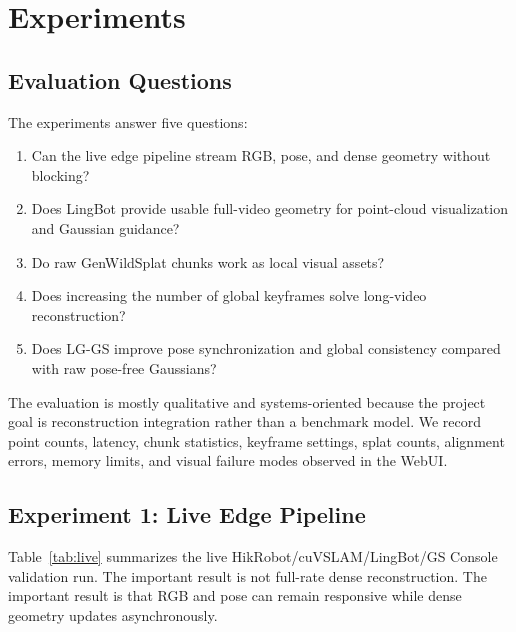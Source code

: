 \documentclass[11pt]{article}
\newcommand{\methodabbr}{LG-GS}
\newcommand{\RouteB}{\methodabbr\xspace}
\begin{document}
\section{Experiments}

\subsection{Evaluation Questions}

The experiments answer five questions:

\begin{enumerate}
    \item Can the live edge pipeline stream RGB, pose, and dense geometry without blocking?
    \item Does LingBot provide usable full-video geometry for point-cloud visualization and Gaussian guidance?
    \item Do raw GenWildSplat chunks work as local visual assets?
    \item Does increasing the number of global keyframes solve long-video reconstruction?
    \item Does \RouteB improve pose synchronization and global consistency compared with raw pose-free Gaussians?
\end{enumerate}

The evaluation is mostly qualitative and systems-oriented because the project goal is reconstruction integration rather than a benchmark model. We record point counts, latency, chunk statistics, keyframe settings, splat counts, alignment errors, memory limits, and visual failure modes observed in the WebUI.

\subsection{Experiment 1: Live Edge Pipeline}

Table~\ref{tab:live} summarizes the live HikRobot/cuVSLAM/LingBot/GS Console validation run. The important result is not full-rate dense reconstruction. The important result is that RGB and pose can remain responsive while dense geometry updates asynchronously.
\end{document}
